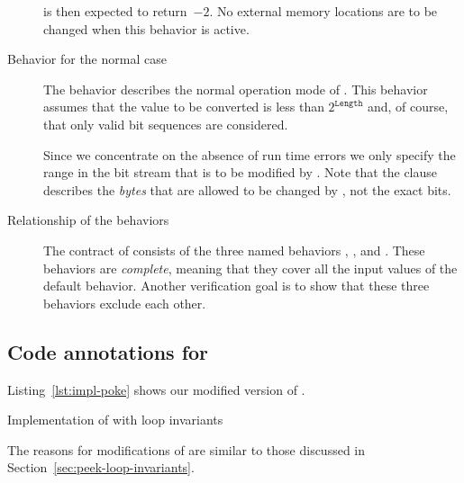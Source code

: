 \begin{description}
\poke is then expected to return~$-2$.
No external memory locations are to be changed when this behavior is active.

\item[Behavior for the normal case]

The behavior  describes the normal operation mode of \poke.
This behavior assumes that the value to be converted is less than $2^{\mathtt{Length}}$
and, of course, that only valid bit sequences are considered.

Since we concentrate on the absence of run time errors we only
specify the range in the bit stream that is to be modified by \poke.
Note that the  clause describes the \emph{bytes}
that are allowed to be changed by \poke, not the exact bits.


\item[Relationship of the behaviors]

The contract of \poke consists of the three named behaviors
, , and .
These behaviors are \emph{complete}, meaning that they cover all the input values
of the default behavior.
Another verification goal is to show that these three behaviors exclude each other.

\end{description}


\clearpage

\subsection{Code annotations for \poke}
\label{sec:poke-loop-invariants}

Listing~\ref{lst:impl-poke} shows our modified version of \poke.

\begin{listing}[hbt]
\begin{minipage}{\textwidth}

\end{minipage}
\caption{\label{lst:impl-poke} Implementation of \poke with loop invariants}
\end{listing}

\clearpage

The reasons for modifications of \poke are similar to those discussed
in Section~\ref{sec:peek-loop-invariants}.

